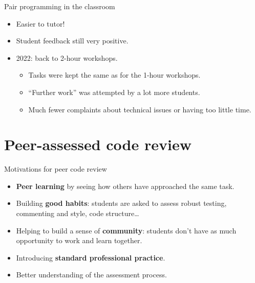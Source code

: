 \documentclass[aspectratio=169, 12pt]{beamer}
\begin{document}
\begin{frame}{Pair programming in the classroom}
    \begin{itemize}
        \item Easier to tutor!
        \item Student feedback still very positive.
        \item 2022: back to 2-hour workshops.
            \begin{itemize}
                \item Tasks were kept the same as for the 1-hour workshops.
                \item ``Further work'' was attempted by a lot more students.
                \item Much fewer complaints about technical issues or having too little time.
            \end{itemize}
    \end{itemize}
\end{frame}

\section{Peer-assessed code review}

\begin{frame}{Motivations for peer code review}
    \begin{itemize}
        \item<1-> \textbf{Peer learning} by seeing how others have approached the same task.
        \item<2-> Building \textbf{good habits}: students are asked to assess robust testing, commenting and style, code structure\ldots
        \item<3-> Helping to build a sense of \textbf{community}: students don't have as much opportunity to work and learn together.
        \item<4-> Introducing \textbf{standard professional practice}.
        \item<5-> Better understanding of the assessment process.
    \end{itemize}
\end{frame}
\end{document}

